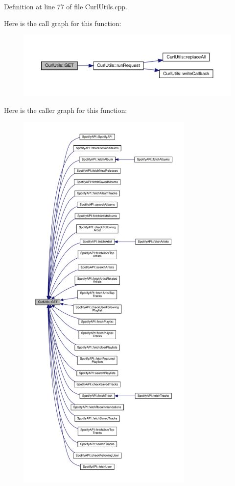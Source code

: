 Definition at line 77 of file Curl\+Utils.\+cpp.

Here is the call graph for this function\+:
\nopagebreak
\begin{figure}[H]
\begin{center}
\leavevmode
\includegraphics[width=350pt]{class_curl_utils_ac500280637c99900b1f1e64d5be58733_cgraph}
\end{center}
\end{figure}
Here is the caller graph for this function\+:
\nopagebreak
\begin{figure}[H]
\begin{center}
\leavevmode
\includegraphics[height=550pt]{class_curl_utils_ac500280637c99900b1f1e64d5be58733_icgraph}
\end{center}
\end{figure}
\mbox{\label{class_curl_utils_ad923cee3ef19b5d7944f68ffb50b2fb3}} 
